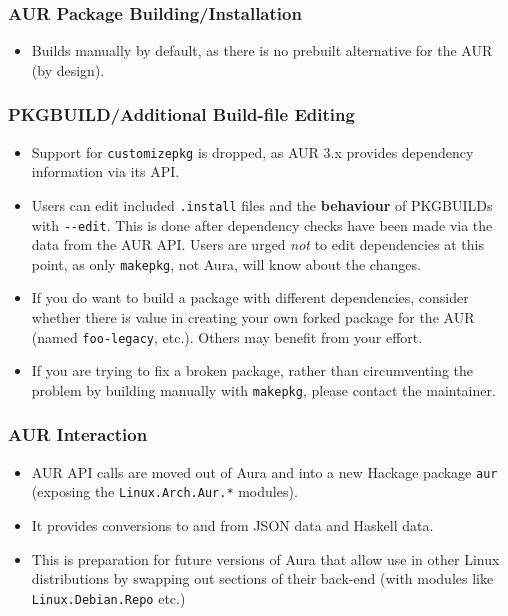 \documentclass{article}
\begin{document}
\subsubsection{AUR Package
Building/Installation}\label{aur-package-buildinginstallation}

\begin{itemize}
\itemsep1pt\parskip0pt
\item
  Builds manually by default, as there is no prebuilt alternative for
  the AUR (by design).
\end{itemize}

\subsubsection{PKGBUILD/Additional Build-file
Editing}\label{pkgbuildadditional-build-file-editing}

\begin{itemize}
\itemsep1pt\parskip0pt
\item
  Support for \texttt{customizepkg} is dropped, as AUR 3.x provides
  dependency information via its API.
\item
  Users can edit included \texttt{.install} files and the
  \textbf{behaviour} of PKGBUILDs with \texttt{-\/-edit}. This is done
  after dependency checks have been made via the data from the AUR API.
  Users are urged \emph{not} to edit dependencies at this point, as only
  \texttt{makepkg}, not Aura, will know about the changes.
\item
  If you do want to build a package with different dependencies,
  consider whether there is value in creating your own forked package
  for the AUR (named \texttt{foo-legacy}, etc.). Others may benefit from
  your effort.
\item
  If you are trying to fix a broken package, rather than circumventing
  the problem by building manually with \texttt{makepkg}, please contact
  the maintainer.
\end{itemize}

\subsubsection{AUR Interaction}\label{aur-interaction}

\begin{itemize}
\itemsep1pt\parskip0pt
\item
  AUR API calls are moved out of Aura and into a new Hackage package
  \texttt{aur} (exposing the \texttt{Linux.Arch.Aur.*} modules).
\item
  It provides conversions to and from JSON data and Haskell data.
\item
  This is preparation for future versions of Aura that allow use in
  other Linux distributions by swapping out sections of their back-end
  (with modules like \texttt{Linux.Debian.Repo} etc.)
\end{itemize}
\end{document}

